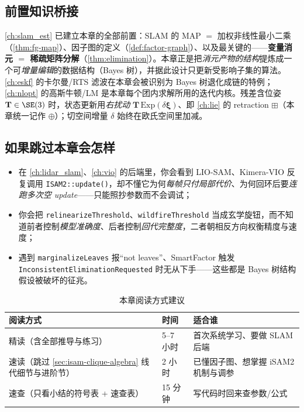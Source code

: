 \subsection*{前置知识桥接}
\cref{ch:slam_est} 已建立本章的全部前置：SLAM 的 MAP $=$ 加权非线性最小二乘（\cref{thm:fg-map}）、因子图的定义（\cref{def:factor-graph}）、以及最关键的——\textbf{变量消元 $=$ 稀疏矩阵分解}（\cref{thm:elimination}）。本章正是把\emph{消元产物的结构}提炼成一个可\emph{增量编辑}的数据结构（Bayes 树），并据此设计只更新受影响子集的算法。\cref{ch:eskf} 的卡尔曼/RTS 滤波在本章会被识别为 Bayes 树退化成链的特例；\cref{ch:nlopt} 的高斯牛顿/LM 是本章每个团内求解所用的迭代内核。残差含位姿 $\mathbf{T}\in\SE(3)$ 时，状态更新用\emph{右扰动} $\mathbf{T}\,\mathrm{Exp}(\delta\boldsymbol{\xi})$、即 \cref{ch:lie} 的 retraction $\boxplus$（本章统一记作 $\oplus$）；切空间增量 $\delta$ 始终在欧氏空间里加减。

\subsection*{如果跳过本章会怎样}
\begin{itemize}
  \item 在 \cref{ch:lidar_slam}、\cref{ch:vio} 的后端里，你会看到 LIO-SAM、Kimera-VIO 反复调用 \texttt{ISAM2::update()}，却不懂它为何\emph{每帧只付局部代价}、为何回环后要\emph{连跑多次空 update}——只能照抄参数而不会调试；
  \item 你会把 \texttt{relinearizeThreshold}、\texttt{wildfireThreshold} 当成玄学旋钮，而不知道前者控制\emph{模型准确度}、后者控制\emph{回代完整度}，二者朝相反方向权衡精度与速度；
  \item 遇到 \texttt{marginalizeLeaves} 报“not leaves”、SmartFactor 触发 \texttt{InconsistentEliminationRequested} 时无从下手——这些都是 Bayes 树结构假设被破坏的征兆。
\end{itemize}

\begin{table}[H]\centering\small
\caption{本章阅读方式建议}
\begin{tabular}{lll}
\toprule
阅读方式 & 时间 & 适合谁 \\
\midrule
精读（含全部推导与练习） & 5--7 小时 & 首次系统学习、要做 SLAM 后端 \\
速读（跳过 \cref{sec:isam-clique-algebra} 线代细节与进阶节） & 2 小时 & 已懂因子图、想掌握 iSAM2 机制与调参 \\
速查（只看小结的符号表 + 速查表） & 15 分钟 & 写代码时回来查参数/公式 \\
\bottomrule
\end{tabular}
\end{table}

